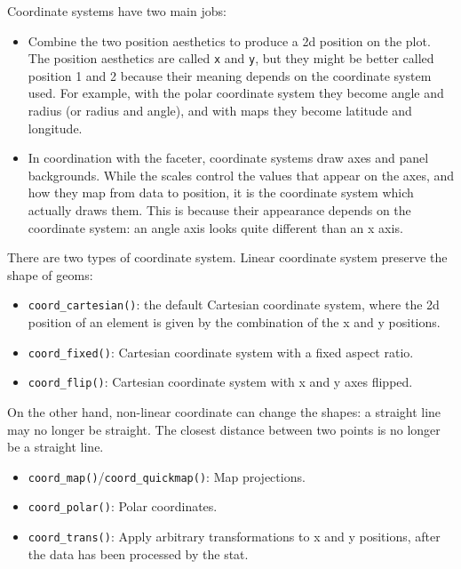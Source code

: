 Coordinate systems have two main jobs: 

\begin{itemize}
\item
  Combine the two position aesthetics to produce a 2d position on the
  plot. The position aesthetics are called \texttt{x} and \texttt{y},
  but they might be better called position 1 and 2 because their meaning
  depends on the coordinate system used. For example, with the polar
  coordinate system they become angle and radius (or radius and angle),
  and with maps they become latitude and longitude.
\item
  In coordination with the faceter, coordinate systems draw axes and
  panel backgrounds. While the scales control the values that appear on
  the axes, and how they map from data to position, it is the coordinate
  system which actually draws them. This is because their appearance
  depends on the coordinate system: an angle axis looks quite different
  than an x axis.
\end{itemize}

There are two types of coordinate system. Linear coordinate system
preserve the shape of geoms:

\begin{itemize}
\item
  \texttt{coord\_cartesian()}: the default Cartesian coordinate system,
  where the 2d position of an element is given by the combination of the
  x and y positions.
\item
  \texttt{coord\_fixed()}: Cartesian coordinate system with a fixed
  aspect ratio.
\item
  \texttt{coord\_flip()}: Cartesian coordinate system with x and y axes
  flipped.
\end{itemize}

On the other hand, non-linear coordinate can change the shapes: a
straight line may no longer be straight. The closest distance between
two points is no longer be a straight line.

\begin{itemize}
\item
  \texttt{coord\_map()}/\texttt{coord\_quickmap()}: Map projections.
\item
  \texttt{coord\_polar()}: Polar coordinates.
\item
  \texttt{coord\_trans()}: Apply arbitrary transformations to x and y
  positions, after the data has been processed by the stat.
\end{itemize}

